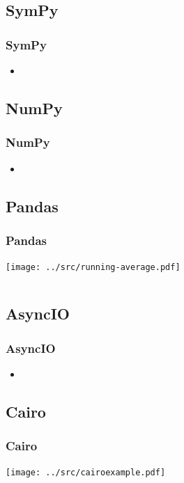 \subsection{SymPy}
\begin{frame}
    \frametitle{SymPy}
    \vspace{5mm}
    
    \begin{itemize}
      \item 
    \end{itemize}
\end{frame}

\subsection{NumPy}
\begin{frame}
    \frametitle{NumPy}
    \vspace{5mm}
    
    \begin{itemize}
      \item 
    \end{itemize}
\end{frame}

\subsection{Pandas}
\begin{frame}
    \frametitle{Pandas}
    \vspace{3mm}
    \hspace{105mm}\texttt{[image: ../src/running-average.pdf]}
    \vspace{-73mm}\inputminted[fontsize=\footnotesize]{python}{../src/pandas-example.py}
\end{frame}

\subsection{AsyncIO}
\begin{frame}
    \frametitle{AsyncIO}
    \vspace{5mm}
    
    \begin{itemize}
      \item 
    \end{itemize}
\end{frame}

\subsection{Cairo}
\begin{frame}
    \frametitle{Cairo}
    \vspace{10mm}
    \hspace{105mm}\texttt{[image: ../src/cairoexample.pdf]}
    \vspace{-75mm}\inputminted[fontsize=\footnotesize]{python}{../src/cairoexample.py}
\end{frame}

